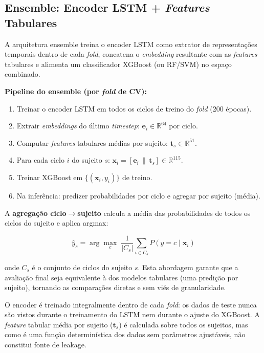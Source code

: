 \documentclass[a4paper,12pt]{article}
\begin{document}
\subsection{Ensemble: Encoder LSTM + \textit{Features} Tabulares}
\label{sec:ensemble}

A arquitetura ensemble treina o encoder LSTM como extrator de representações
temporais dentro de cada \textit{fold}, concatena o \textit{embedding} resultante
com as \textit{features} tabulares e alimenta um classificador XGBoost (ou RF/SVM)
no espaço combinado.

\textbf{Pipeline do ensemble (por \textit{fold} de CV):}

\begin{enumerate}[label=\arabic*.]
  \item Treinar o encoder LSTM em todos os ciclos de treino do \textit{fold}
        (200 épocas).
  \item Extrair \textit{embeddings} do último \textit{timestep}:
        $\mathbf{e}_i \in \mathbb{R}^{64}$ por ciclo.
  \item Computar \textit{features} tabulares médias por sujeito:
        $\mathbf{t}_s \in \mathbb{R}^{51}$.
  \item Para cada ciclo $i$ do sujeito $s$:
        $\mathbf{x}_i = [\mathbf{e}_i \,\|\, \mathbf{t}_s] \in \mathbb{R}^{115}$.
  \item Treinar XGBoost em $\{(\mathbf{x}_i, y_i)\}$ de treino.
  \item Na inferência: predizer probabilidades por ciclo e agregar por sujeito
        (média).
\end{enumerate}

A \textbf{agregação ciclo$\rightarrow$sujeito} calcula a média das probabilidades de
todos os ciclos do sujeito e aplica argmax:

\begin{equation}
  \hat{y}_s = \arg\max_{c}\;
  \frac{1}{|C_s|} \sum_{i \in C_s} P\!\left(y = c \mid \mathbf{x}_i\right)
  \label{eq:agg}
\end{equation}

\noindent onde $C_s$ é o conjunto de ciclos do sujeito $s$. Esta abordagem garante
que a avaliação final seja equivalente à dos modelos tabulares (uma predição por
sujeito), tornando as comparações diretas e sem viés de granularidade.

O encoder é treinado integralmente dentro de cada \textit{fold}: os dados de teste
nunca são vistos durante o treinamento do LSTM nem durante o ajuste do XGBoost. A
\textit{feature} tabular média por sujeito ($\mathbf{t}_s$) é calculada sobre todos
os sujeitos, mas como é uma função determinística dos dados sem parâmetros
ajustáveis, não constitui fonte de leakage.
\end{document}
